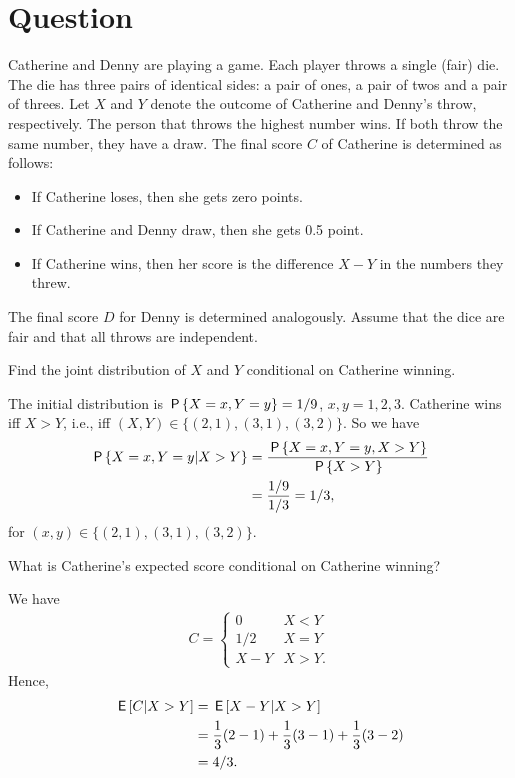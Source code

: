 \section*{Question}


Catherine and Denny are playing a game. Each player throws a single (fair) die. The die has three pairs of identical sides: a pair of ones, a pair of twos and a pair of threes. Let $X$ and $Y$ denote the outcome of Catherine and Denny's throw, respectively. The person that throws the highest number wins. If both throw the same number, they have a draw. The final score $C$ of Catherine is determined as follows:
\begin{itemize}
    \item If Catherine loses, then she gets zero points.
    \item If Catherine and Denny draw, then she gets 0.5 point.
    \item If Catherine wins, then her score is the difference $X -Y$ in the numbers they threw.
\end{itemize}
The final score $D$ for Denny is determined analogously. Assume that the dice are fair and that all throws are independent.

\begin{exercise}[1]
Find the joint distribution of $X$ and $Y$ conditional on Catherine winning.
\begin{solution}
The initial distribution is $\P{X = x, Y = y} = 1/9$, $x,y = 1,2,3$. Catherine wins iff $X>Y$, i.e., iff $(X,Y) \in \{(2,1), (3,1), (3,2)\}$. So we have
\begin{align}
    \P{X=x,Y=y | X>Y} &= \frac{\P{X=x,Y=y,X>Y}}{\P{X>Y}} \\
    &= \frac{1/9}{1/3} = 1/3,
\end{align}
for $(x,y) \in \{(2,1), (3,1), (3,2)\}$.
\end{solution}
\end{exercise}

\begin{exercise}[1.5]
What is Catherine's expected score conditional on Catherine winning?
\begin{solution}
We have
\begin{align}
    C = \begin{cases}
    0 &X < Y \\
    1/2 &X = Y \\
    X - Y &X > Y.
    \end{cases}
\end{align}
Hence,
\begin{align}
    \E{C|X>Y} &= \E{X-Y|X>Y} \\
    &= \frac{1}{3} (2-1) + \frac{1}{3} (3-1) + \frac{1}{3} (3-2) \\
    &= 4/3.
\end{align}
\end{solution}
\end{exercise}

